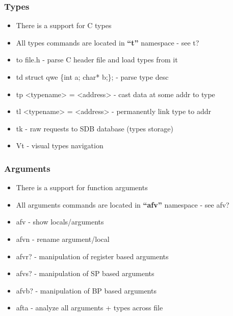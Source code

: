 \documentclass[10pt,pdf,utf8,english,compress,hyperref={unicode}]{beamer}
\begin{document}
\begin{frame}[fragile]
  \frametitle{Types}
  \begin{itemize}
	  \item There is a support for C types
	  \item All types commands are located in \textbf{``t''} namespace - see \alert{t?}
	  \item \alert{to file.h} - parse C header file and load types from it
	  \item \alert{td struct qwe \{int a; char* b;\};} - parse type desc
	  \item \alert{tp <typename> = <address>} - cast data at some addr to type
	  \item \alert{tl <typename> = <address>} - permanently link type to addr
	  \item \alert{tk} - raw requests to SDB database (types storage)
	  \item \alert{Vt} - visual types navigation
  \end{itemize}
\end{frame}

\begin{frame}[fragile]
  \frametitle{Arguments}
  \begin{itemize}
	  \item There is a support for function arguments
	  \item All arguments commands are located in \textbf{``afv''} namespace - see \alert{afv?}
	  \item \alert{afv} - show locals/arguments
	  \item \alert{afvn} - rename argument/local
	  \item \alert{afvr?} - manipulation of register based arguments
	  \item \alert{afvs?} - manipulation of SP based arguments
	  \item \alert{afvb?} - manipulation of BP based arguments
	  \item \alert{afta} - analyze all arguments + types across file
  \end{itemize}
\end{frame}
\end{document}
